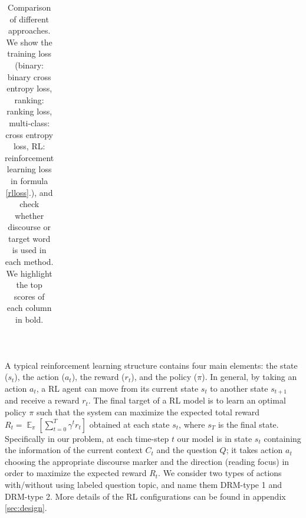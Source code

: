 \begin{table}[t]
\begin{center}
{\begin{tabular}{|l|c|c|c|c|cccccccc|}
		\end{tabular}

		}\vspace{0.4mm}	\\

	\end{center}
	\caption{Comparison of different approaches. We show the training loss (binary: binary cross entropy loss, ranking: ranking loss, multi-class: cross entropy loss, RL: reinforcement learning loss in formula \ref{rlloss}.), and check whether discourse or target word is used in each method. We highlight the top scores of each column in bold. 
  }\label{tab:main3}
\end{table}

A typical reinforcement learning structure contains four main elements: the state ($s_t$), the action ($a_t$), the reward ($r_t$), and the policy ($\pi$). In general, by taking an action $a_t$, a RL agent can move from its current state $s_t$ to another state $s_{t+1}$ and receive a reward $r_t$. The final target of a RL model is to learn an optimal policy $\pi$ such that the system can maximize the expected total reward $R_t=\mathop{\mathbb{E}}_\pi[\sum_{t=0}^{T}\gamma^t r_t]$ obtained at each state $s_t$, where $s_T$ is the final state. Specifically in our problem, at each time-step $t$ our model is in state $s_t$ containing the information of the current context $C_t$ and the question $Q$; it takes action $a_t$ choosing the appropriate discourse marker and the direction (reading focus) in order to maximize the expected reward $R_t$. We consider two types of actions with/without using labeled question topic, and name them DRM-type 1 and DRM-type 2. More details of the RL configurations can be found in appendix \ref{sec:design}.

